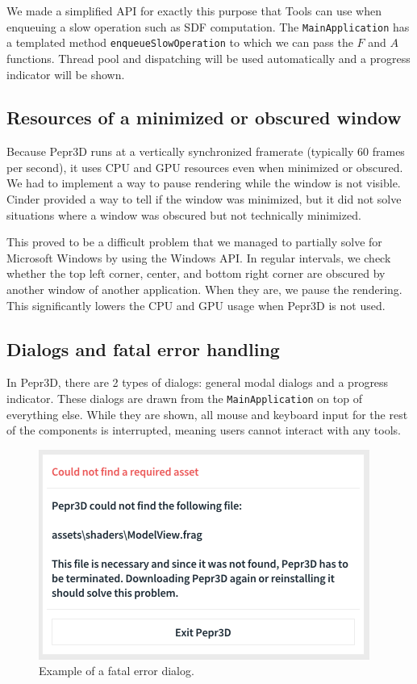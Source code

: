 We made a simplified API for exactly this purpose that Tools can use when enqueuing a slow operation such as SDF computation.
The \texttt{MainApplication} has a templated method \texttt{enqueueSlowOperation} to which we can pass the $F$ and $A$ functions.
Thread pool and dispatching will be used automatically and a progress indicator will be shown.

\subsection{Resources of a minimized or obscured window}

Because Pepr3D runs at a vertically synchronized framerate (typically 60 frames per second), it uses CPU and GPU resources even when minimized or obscured.
We had to implement a way to pause rendering while the window is not visible.
Cinder provided a way to tell if the window was minimized, but it did not solve situations where a window was obscured but not technically minimized.

This proved to be a difficult problem that we managed to partially solve for Microsoft Windows by using the Windows API.
In regular intervals, we check whether the top left corner, center, and bottom right corner are obscured by another window of another application.
When they are, we pause the rendering.
This significantly lowers the CPU and GPU usage when Pepr3D is not used.

\subsection{Dialogs and fatal error handling}

In Pepr3D, there are 2 types of dialogs: general modal dialogs and a progress indicator.
These dialogs are drawn from the \texttt{MainApplication} on top of everything else.
While they are shown, all mouse and keyboard input for the rest of the components is interrupted, meaning users cannot interact with any tools.

\begin{figure}[h]
	\centering
	\centerline{\includegraphics[scale=1.0]{images/fatal_error.png}}
	\caption{Example of a fatal error dialog.}
	\label{fig:fatalerror}
\end{figure}

